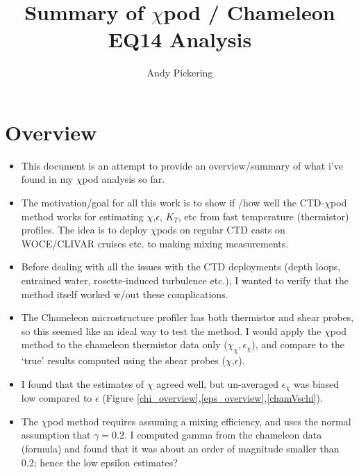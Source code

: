 \documentclass[11pt]{article}
\title{Summary of $\chi$pod / Chameleon EQ14 Analysis}
\author{Andy Pickering}
\begin{document}
\maketitle

\tableofcontents
\newpage


\section{Overview}

\begin{itemize}

\item This document is an attempt to provide an overview/summary of what i've found in my $\chi$pod analysis so far. 

\item The motivation/goal for all this work is to show if /how well the CTD-$\chi$pod method works for estimating $\chi$,$\epsilon$, $K_T$, etc from fast temperature (thermistor) profiles. The idea is to deploy $\chi$pods on regular CTD casts on WOCE/CLIVAR cruises etc. to making mixing measurements.

\item Before dealing with all the issues with the CTD deployments (depth loops, entrained water, rosette-induced turbulence etc.), I wanted to verify that the method itself worked w/out these complications. 

\item The Chameleon microstructure profiler has both thermistor and shear probes, so this seemed like an ideal way to test the method. I would apply the $\chi$pod method to the chameleon thermistor data only ($\chi_{\chi},\epsilon_{\chi}$), and compare to the `true' results computed using the shear probes ($\chi$,$\epsilon$).

\item I found that the estimates of $\chi$ agreed well, but un-averaged $\epsilon_{\chi}$ was biased low compared to $\epsilon$ (Figure \ref{chi_overview},\ref{eps_overview},\ref{chamVschi}).

\item The $\chi$pod method requires assuming a mixing efficiency, and uses the normal assumption that $\gamma=0.2$. I computed gamma from the chameleon data (formula) and found that it was about an order of magnitude smaller than 0.2; hence the low epsilon estimates?



\end{itemize}
\end{document}
